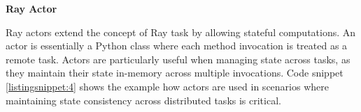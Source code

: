 

\textbf{Ray Actor}

Ray actors extend the concept of Ray task by allowing stateful computations. An actor is essentially a Python class where each method invocation is treated as a remote task. Actors are particularly useful when managing state across tasks, as they maintain their state in-memory across multiple invocations. Code snippet \autoref{listingsnippet:4} shows the example how actors are used in scenarios where maintaining state consistency across distributed tasks is critical. \cite{ray_doc}

